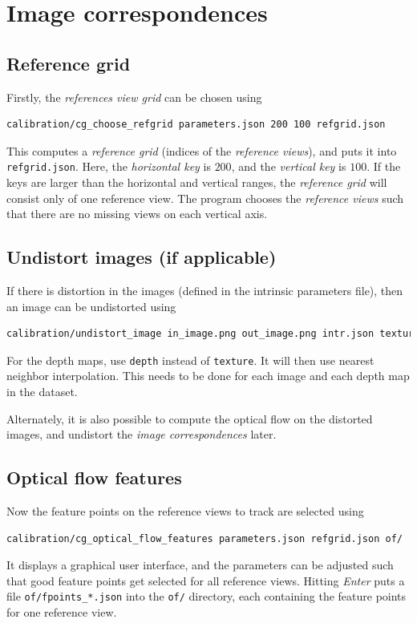 \documentclass[11pt]{scrreprt}
\begin{document}
\section{Image correspondences}

\subsection{Reference grid}
Firstly, the \emph{references view grid} can be chosen using
\begin{lstlisting}[language=bash]
calibration/cg_choose_refgrid parameters.json 200 100 refgrid.json
\end{lstlisting}
This computes a \emph{reference grid} (indices of the \emph{reference views}), and puts it into \texttt{refgrid.json}. Here, the \emph{horizontal key} is $200$, and the \emph{vertical key} is $100$. If the keys are larger than the horizontal and vertical ranges, the \emph{reference grid} will consist only of one reference view. The program chooses the \emph{reference views} such that there are no missing views on each vertical axis.

\subsection{Undistort images (if applicable)}
If there is distortion in the images (defined in the intrinsic parameters file), then an image can be undistorted using
\begin{lstlisting}[language=bash]
calibration/undistort_image in_image.png out_image.png intr.json texture
\end{lstlisting}
For the depth maps, use \texttt{depth} instead of \texttt{texture}. It will then use nearest neighbor interpolation. This needs to be done for each image and each depth map in the dataset.

Alternately, it is also possible to compute the optical flow on the distorted images, and undistort the \emph{image correspondences} later.

\subsection{Optical flow features}
Now the feature points on the reference views to track are selected using
\begin{lstlisting}[language=bash]
calibration/cg_optical_flow_features parameters.json refgrid.json of/
\end{lstlisting}
It displays a graphical user interface, and the parameters can be adjusted such that good feature points get selected for all reference views. Hitting \emph{Enter} puts a file \texttt{of/fpoints\_*.json} into the \texttt{of/} directory, each containing the feature points for one reference view.
\end{document}
